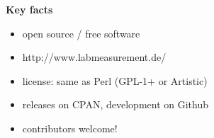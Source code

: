 \documentclass[portrait]{a0poster}
\newcommand{\heading}[1]{
  {\color{heading}\boldmath\textbf{\huge #1}}\\[\medskipamount]
}
\begin{document}
{\begin{minipage}[t][\columnheighta-2\fboxsep-2\fboxrule][t]
\begin{minipage}{\textwidth}
\vspace*{2cm}
\heading{Key facts}
\vspace*{-2cm}
\begin{itemize}
 \item
 open source / free software\\[-5cm]
 \item 
 http://www.labmeasurement.de/
 \hfill{}
 \item
 license: same as Perl (GPL-1+ or Artistic)
 \item
 releases on CPAN, development on Github
 \item
 contributors welcome!
\end{itemize}



%
%
%
%
\end{minipage}
\end{minipage}}
%
%
%
%
%
\end{document}

